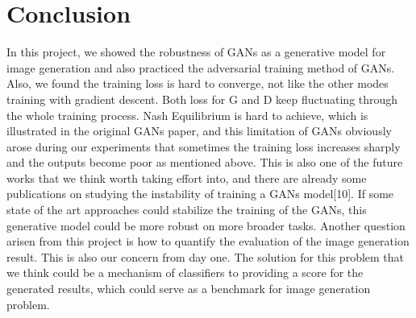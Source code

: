 \documentclass[10pt,twocolumn,letterpaper]{article}
\begin{document}
\section{Conclusion}
In this project, we showed the robustness of GANs as a generative model for image generation and also practiced the adversarial training method of GANs. Also, we found the training loss is hard to converge, not like the other modes training with gradient descent. Both loss for G and D keep fluctuating through the whole training process. Nash Equilibrium is hard to achieve, which is illustrated in the original GANs paper, and this limitation of GANs obviously arose during our experiments that sometimes the training loss increases sharply and the outputs become poor as mentioned above. This is also one of the future works that we think worth taking effort into, and there are already some publications on studying the instability of training a GANs model[10]. If some state of the art approaches could stabilize the training of the GANs, this generative model could be more robust on more broader tasks. Another question arisen from this project is how to quantify the evaluation of the image generation result. This is also our concern from day one. The solution for this problem that we think could be a mechanism of classifiers to providing a score for the generated results, which could serve as a benchmark for image generation problem.
{\small


}
\end{document}
